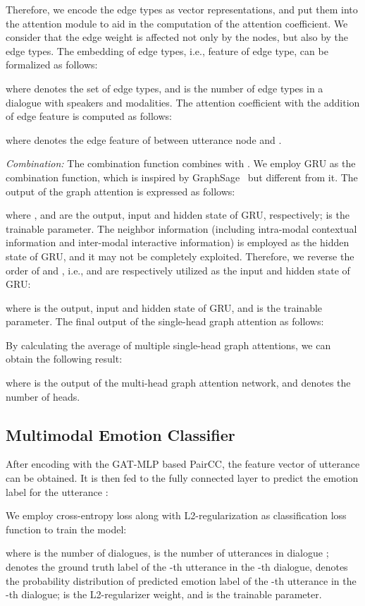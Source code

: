\documentclass[lettersize,journal]{IEEEtran}
\begin{document}
Therefore, we encode the edge types as vector representations, and put them into the attention module to aid in the computation of the attention coefficient. We consider that the edge weight is affected not only by the nodes, but also by the edge types. The embedding of edge types, i.e., feature of edge type, can be formalized as follows:

where  denotes the set of edge types, and  is the number of edge types in a dialogue with  speakers and  modalities. The attention coefficient with the addition of edge feature is computed as follows:

where  denotes the edge feature of between utterance node  and .

\textit{Combination:} The combination function  combines  with . We employ GRU as the combination function, which is inspired by GraphSage~\cite{hamilton2017inductive} but different from it. The output of the graph attention is expressed as follows:

where ,  and  are the output, input and hidden state of GRU, respectively;  is the trainable parameter. The neighbor information  (including intra-modal contextual information and inter-modal interactive information) is employed as the hidden state of GRU, and it may not be completely exploited. Therefore, we reverse the order of  and , i.e.,  and  are respectively utilized as the input and hidden state of GRU:

where  is the output, input and hidden state of GRU, and  is the trainable parameter. The final output of the single-head graph attention  as follows:

By calculating the average of multiple single-head graph attentions, we can obtain the following result:

where  is the output of the multi-head graph attention network, and  denotes the number of heads.

\subsection{Multimodal Emotion Classifier}
After encoding with the GAT-MLP based PairCC, the feature vector  of utterance  can be obtained. It is then fed to the fully connected layer to predict the emotion label  for the utterance :


We employ cross-entropy loss along with L2-regularization as classification loss function to train the model:

where  is the number of dialogues,  is the number of utterances in dialogue ;  denotes the ground truth label of the -th utterance in the -th dialogue,  denotes the probability distribution of predicted emotion label of the -th utterance in the -th dialogue;  is the L2-regularizer weight, and  is the trainable parameter. 
\end{document}
